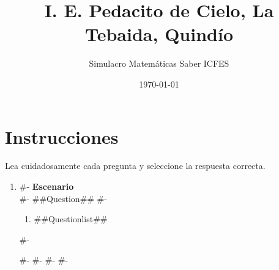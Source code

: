 \documentclass[a4paper,12pt]{article}
\title{I. E. Pedacito de Cielo, La Tebaida, Quindío}
\author{Simulacro Matemáticas Saber ICFES}
\date{\today}
\begin{document}
\maketitle

\section*{Instrucciones}

Lea cuidadosamente cada pregunta y seleccione la respuesta correcta.

\vspace{1em}

\begin{enumerate}[label=\arabic*.]
#-
  \item
#-
  \textbf{Escenario}\\
#-
  ##Question##
#-
  \begin{enumerate}[label=(\alph*)]
    \item ##Questionlist##
  \end{enumerate}
#-

#-
#-
#-
#-
\end{enumerate}
\end{document}
